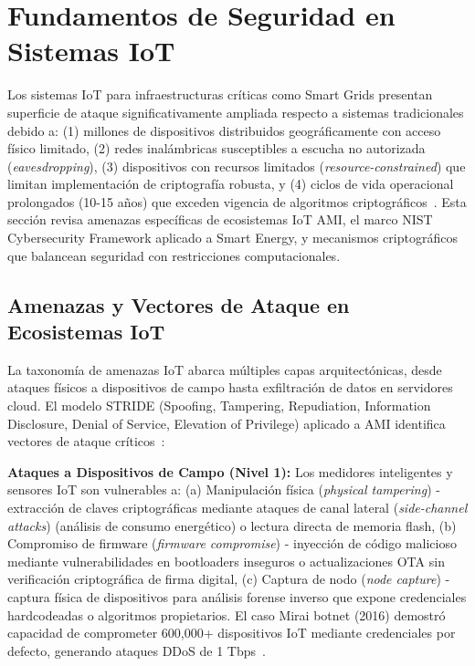 

\section{Fundamentos de Seguridad en Sistemas IoT}
\label{sec:marco-seguridad}

Los sistemas IoT para infraestructuras críticas como Smart Grids presentan superficie de ataque significativamente ampliada respecto a sistemas tradicionales debido a: (1) millones de dispositivos distribuidos geográficamente con acceso físico limitado, (2) redes inalámbricas susceptibles a escucha no autorizada (\textit{eavesdropping}), (3) dispositivos con recursos limitados (\textit{resource-constrained}) que limitan implementación de criptografía robusta, y (4) ciclos de vida operacional prolongados (10-15 años) que exceden vigencia de algoritmos criptográficos~\cite{BlockchainBasedSecureAuthentication2025,nandalSECURITYRISKSIoT2025}. Esta sección revisa amenazas específicas de ecosistemas IoT AMI, el marco NIST Cybersecurity Framework aplicado a Smart Energy, y mecanismos criptográficos que balancean seguridad con restricciones computacionales.

\subsection{Amenazas y Vectores de Ataque en Ecosistemas IoT}
\label{sec:marco-seguridad-amenazas}

La taxonomía de amenazas IoT abarca múltiples capas arquitectónicas, desde ataques físicos a dispositivos de campo hasta exfiltración de datos en servidores cloud. El modelo STRIDE (Spoofing, Tampering, Repudiation, Information Disclosure, Denial of Service, Elevation of Privilege) aplicado a AMI identifica vectores de ataque críticos~\cite{alsuwaidiSecuringSmartGrid2024}:

\textbf{Ataques a Dispositivos de Campo (Nivel 1):} Los medidores inteligentes y sensores IoT son vulnerables a: (a) Manipulación física (\textit{physical tampering}) - extracción de claves criptográficas mediante ataques de canal lateral (\textit{side-channel attacks}) (análisis de consumo energético) o lectura directa de memoria flash, (b) Compromiso de firmware (\textit{firmware compromise}) - inyección de código malicioso mediante vulnerabilidades en bootloaders inseguros o actualizaciones OTA sin verificación criptográfica de firma digital, (c) Captura de nodo (\textit{node capture}) - captura física de dispositivos para análisis forense inverso que expone credenciales hardcodeadas o algoritmos propietarios. El caso Mirai botnet (2016) demostró capacidad de comprometer 600,000+ dispositivos IoT mediante credenciales por defecto, generando ataques DDoS de 1 Tbps~\cite{nandalSECURITYRISKSIoT2025}.

